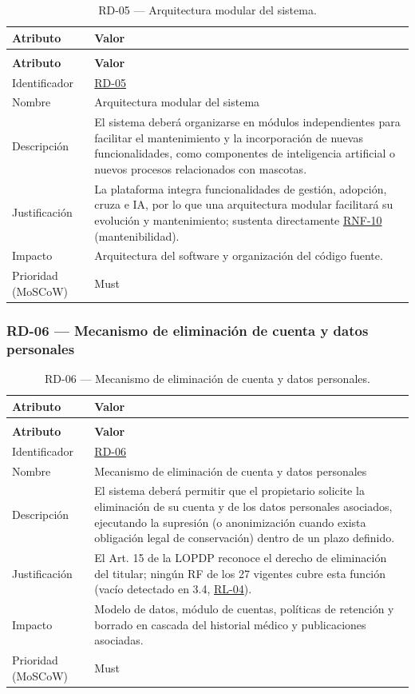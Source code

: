\documentclass[journal,onecolumn]{IEEEtran}
\makeatletter
\newenvironment{atributos}[2]{%
	\small
	\begin{longtable}{@{}>{\raggedright\arraybackslash}p{4.2cm} >{\raggedright\arraybackslash}p{11.2cm}@{}}
		\caption{#2}\label{tab:#1}\\
		\toprule
		\textbf{Atributo} & \textbf{Valor} \\
		\midrule
		\endfirsthead
		\multicolumn{2}{@{}l}{\small\itshape (continuación)}\\
		\toprule
		\textbf{Atributo} & \textbf{Valor} \\
		\midrule
		\endhead
		\bottomrule
		\endlastfoot
	}{%
	\end{longtable}
	\normalsize
}
\makeatother
\begin{document}
	\begin{atributos}{RD-05}{RD-05 --- Arquitectura modular del sistema.}
		Identificador & \hyperref[tab:RD-05]{RD-05} \\
		Nombre & Arquitectura modular del sistema \\
		Descripción & El sistema deberá organizarse en módulos independientes para facilitar el mantenimiento y la incorporación de nuevas funcionalidades, como componentes de inteligencia artificial o nuevos procesos relacionados con mascotas. \\
		Justificación & La plataforma integra funcionalidades de gestión, adopción, cruza e IA, por lo que una arquitectura modular facilitará su evolución y mantenimiento; sustenta directamente \hyperref[tab:RNF-10]{RNF-10} (mantenibilidad). \\
		Impacto & Arquitectura del software y organización del código fuente. \\
		Prioridad (MoSCoW) & Must \\
	\end{atributos}
	
	\subsubsection{RD-06 --- Mecanismo de eliminación de cuenta y datos personales}
	
	\begin{atributos}{RD-06}{RD-06 --- Mecanismo de eliminación de cuenta y datos personales.}
		Identificador & \hyperref[tab:RD-06]{RD-06} \\
		Nombre & Mecanismo de eliminación de cuenta y datos personales \\
		Descripción & El sistema deberá permitir que el propietario solicite la eliminación de su cuenta y de los datos personales asociados, ejecutando la supresión (o anonimización cuando exista obligación legal de conservación) dentro de un plazo definido. \\
		Justificación & El Art. 15 de la LOPDP reconoce el derecho de eliminación del titular; ningún RF de los 27 vigentes cubre esta función (vacío detectado en 3.4, \hyperref[rl:04]{RL-04}). \\
		Impacto & Modelo de datos, módulo de cuentas, políticas de retención y borrado en cascada del historial médico y publicaciones asociadas. \\
		Prioridad (MoSCoW) & Must \\
	\end{atributos}
	
\end{document}
